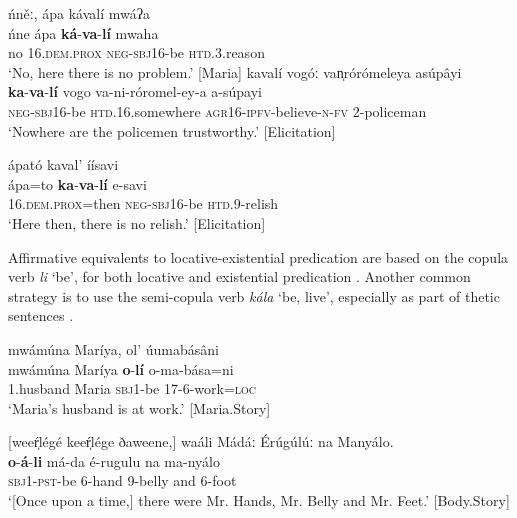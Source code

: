 \documentclass[output=paper,colorlinks=true, citecolor=brown,draftmode]{langscibook}
\begin{document}
{
\ea\label{ex:cuw:30}
    \ea\label{ex:cuw:30a} ńněː, ápa kávalí mwáʔa \\
        \gll  ńne ápa \textbf{ká}{}-\textbf{va}{}-\textbf{lí} mwaha\\
             no 16.\textsc{dem.prox} \textsc{neg-sbj1}6-be \textsc{htd.3}.reason \\
        \glt ‘No, here there is no problem.’ [Maria]
\newpage
    \ex\label{ex:cuw:30b} kavalí vogóː van̩rórómeleya asúpâyi\\
        \gll  \textbf{ka}{}-\textbf{va}{}-\textbf{lí} vogo va-ni-róromel-ey-a a-súpayi\\
            \textsc{neg-sbj1}6-be \textsc{htd}.16.somewhere \textsc{agr}16-\textsc{ipfv}{}-believe-\textsc{n-fv} 2-policeman \\
        \glt ‘Nowhere are the policemen trustworthy.’ [Elicitation]

    \ex\label{ex:cuw:30c} ápató kaval’ íísavi\\
          \gll ápa=to \textbf{ka}{}-\textbf{va}{}-\textbf{lí} e-savi \\
            16.\textsc{dem.prox}=then \textsc{neg-sbj1}6-be \textsc{htd.9}{}-relish  \\
        \glt ‘Here then, there is no relish.’ [Elicitation]
    \z
\z }

Affirmative equivalents to locative-existential predication are based on the copula verb \textit{li} ‘be’, for both locative  and existential predication . Another common strategy is to use the semi-copula verb \textit{kála} ‘be, live’, especially as part of thetic sentences .

\ea\label{ex:cuw:31}
    \ea\label{ex:cuw:31a} mwámúna Maríya, ol’ úumabásâni \\ 
        \gll mwámúna Maríya \textbf{o}{}-\textbf{lí} o-ma-bása=ni \\
               1.husband Maria \textsc{sbj1-}be 17-6-work=\textsc{loc} \\
        \glt  ‘Maria’s husband is at work.’ [Maria.Story]

    \ex\label{ex:cuw:31b} [weeŕ̩légé keeŕ̩lége ðaweene,] waáli Mádáː \'{E}rúgúlúː na Manyálo. \\ 
        \gll \textbf{o}{}-\textbf{á}{}-\textbf{li} má-da é-rugulu na ma-nyálo\\
              \textsc{sbj1-}\textsc{pst}{}-be 6-hand 9-belly and 6-foot  \\
        \glt  ‘[Once upon a time,] there were Mr. Hands, Mr. Belly and Mr. Feet.’ [Body.Story]
    \z
\z
\end{document}
